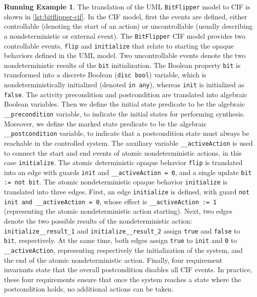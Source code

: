 \documentclass{article}
\theoremstyle{definition}
\newtheorem*{example*}{Running Example}
\begin{document}
\begin{example*}
The translation of the UML \texttt{BitFlipper} model to CIF is shown in \autoref{lst:bitflipper-cif}.
In the CIF model, first the events are defined, either controllable (denoting the start of an action) or uncontrollable (usually describing a nondeterministic or external event).
The \texttt{BitFlipper} CIF model provides two controllable events, \texttt{flip} and \texttt{initialize} that relate to starting the opaque behaviors defined in the UML model.
Two uncontrollable events denote the two nondeterministic results of the \texttt{bit} initialization.
The Boolean property \texttt{bit} is transformed into a discrete Boolean (\texttt{disc bool}) variable, which is nondeterministically initialized (denoted \texttt{in any}), whereas \texttt{init} is initialized as \texttt{false}.
The activity precondition and postcondition are translated into algebraic Boolean variables.
Then we define the initial state predicate to be the algebraic \texttt{\_\_precondition} variable, to indicate the initial states for performing synthesis.
Moreover, we define the marked state predicate to be the algebraic \texttt{\_\_postcondition} variable, to indicate that a postcondition state must always be reachable in the controlled system.
The auxiliary variable \texttt{\_\_activeAction} is used to connect the start and end events of atomic nondeterministic actions, in this case \texttt{initialize}.
The atomic deterministic opaque behavior \texttt{flip} is translated into an edge with guards \texttt{init} and \texttt{\_\_activeAction = 0}, and a single update \texttt{bit := not bit}.
The atomic nondeterministic opaque behavior \texttt{initialize} is translated into three edges.
First, an edge \texttt{initialize} is defined, with guard \texttt{not init and \_\_activeAction = 0}, whose effect is \texttt{\_\_activeAction := 1} (representing the atomic nondeterministic action starting).
Next, two edges denote the two possible results of the nondeterministic action: \texttt{initialize\_\_result\_1} and \texttt{initialize\_\_result\_2} assign \texttt{true} and \texttt{false} to \texttt{bit}, respectively.
At the same time, both edges assign \texttt{true} to \texttt{init} and \texttt{0} to \texttt{\_\_activeAction}, representing respectively the initialization of the system, and the end of the atomic nondeterministic action.
Finally, four requirement invariants state that the overall postcondition disables all CIF events.
In practice, these four requirements ensure that once the system reaches a state where the postcondition holds, no additional actions can be taken.
\end{example*}
\end{document}
